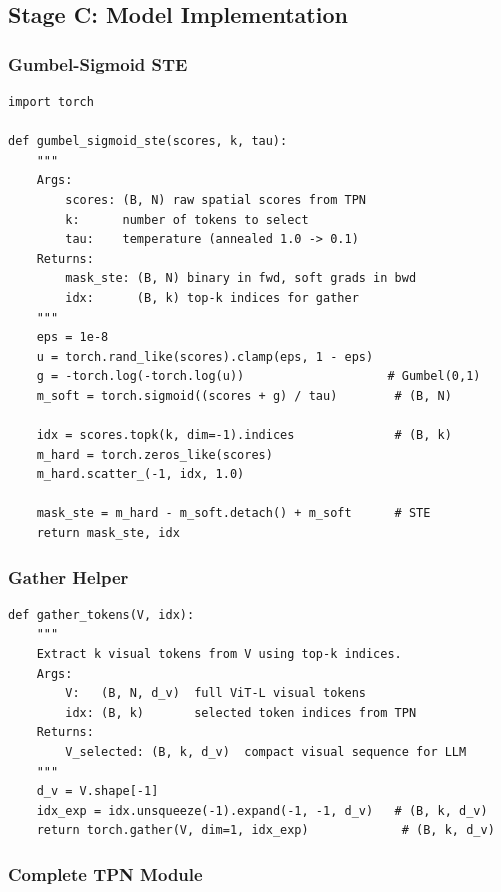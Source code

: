 \documentclass[11pt,a4paper]{article}
\begin{document}
\subsection{Stage C: Model Implementation}

\subsubsection{Gumbel-Sigmoid STE}

\begin{lstlisting}[caption={Gumbel-Sigmoid STE (returns soft mask for grad flow).}]
import torch

def gumbel_sigmoid_ste(scores, k, tau):
    """
    Args:
        scores: (B, N) raw spatial scores from TPN
        k:      number of tokens to select
        tau:    temperature (annealed 1.0 -> 0.1)
    Returns:
        mask_ste: (B, N) binary in fwd, soft grads in bwd
        idx:      (B, k) top-k indices for gather
    """
    eps = 1e-8
    u = torch.rand_like(scores).clamp(eps, 1 - eps)
    g = -torch.log(-torch.log(u))                    # Gumbel(0,1)
    m_soft = torch.sigmoid((scores + g) / tau)        # (B, N)

    idx = scores.topk(k, dim=-1).indices              # (B, k)
    m_hard = torch.zeros_like(scores)
    m_hard.scatter_(-1, idx, 1.0)

    mask_ste = m_hard - m_soft.detach() + m_soft      # STE
    return mask_ste, idx
\end{lstlisting}

\subsubsection{Gather Helper}

\begin{lstlisting}[caption={Gather top-k visual tokens (Option B).}]
def gather_tokens(V, idx):
    """
    Extract k visual tokens from V using top-k indices.
    Args:
        V:   (B, N, d_v)  full ViT-L visual tokens
        idx: (B, k)       selected token indices from TPN
    Returns:
        V_selected: (B, k, d_v)  compact visual sequence for LLM
    """
    d_v = V.shape[-1]
    idx_exp = idx.unsqueeze(-1).expand(-1, -1, d_v)   # (B, k, d_v)
    return torch.gather(V, dim=1, idx_exp)             # (B, k, d_v)
\end{lstlisting}

\subsubsection{Complete TPN Module}
\end{document}
